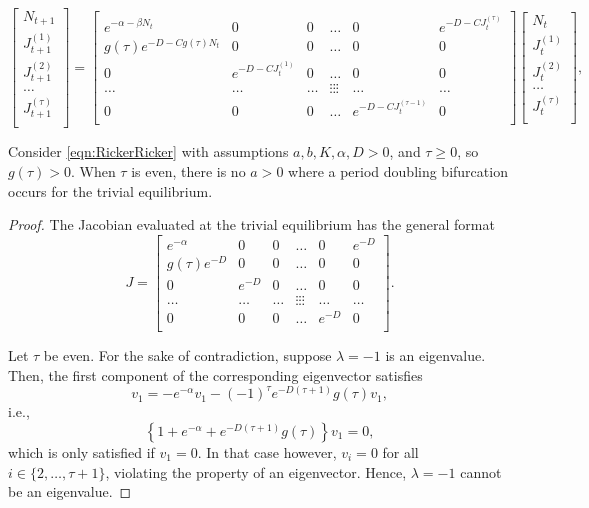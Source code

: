 \documentclass[10pt,a4paper]{amsart}
\begin{document}
\begin{equation} \label{eqn:RickerRicker}
   \begin{bmatrix}
    N_{t+1}\\
    J_{t+1}^{(1)}\\
    J_{t+1}^{(2)}\\
    \ldots\\
    J_{t+1}^{(\tau)}\\
    \end{bmatrix} = \begin{bmatrix}
e^{-\alpha-\beta N_t} & 0 & 0 & \ldots & 0 & e^{-D-CJ_{t}^{(\tau)}}\\
 g(\tau)e^{-D-C g(\tau)N_{t}} & 0 & 0 & \ldots & 0 & 0\\
0 & e^{-D-CJ_{t}^{(1)}} & 0 & \ldots & 0 & 0\\
\ldots & \ldots & \ldots & \vdots\vdots\vdots & \ldots & \ldots\\
0 & 0 & 0 & \ldots & e^{-D-CJ_{t}^{(\tau-1)}} & 0\\
\end{bmatrix}
\begin{bmatrix}
    N_t\\
    J_t^{(1)}\\
    J_t^{(2)}\\
    \ldots\\
    J_t^{(\tau)}\\
\end{bmatrix},
\end{equation}

\begin{theorem}\label{thm:RR_PD}
     Consider \eqref{eqn:RickerRicker} with assumptions $a,b,K,\alpha,D>0$, and $\tau\geq0$, so $g(\tau)>0$. When $\tau$ is even, there is no $a>0$ where a period doubling bifurcation occurs for the trivial equilibrium.
\end{theorem}

\begin{proof}
   The Jacobian evaluated at the trivial equilibrium has the general format
\begin{equation*} 
 J=\begin{bmatrix}
e^{-\alpha} & 0 & 0 & \ldots & 0 & e^{-D}\\
 g(\tau)e^{-D} & 0 & 0 & \ldots & 0 & 0\\
0 & e^{-D} & 0 & \ldots & 0 & 0\\
\ldots & \ldots & \ldots & \vdots\vdots\vdots & \ldots & \ldots\\
0 & 0 & 0 & \ldots & e^{-D} & 0\\
\end{bmatrix}.
\end{equation*}

Let $\tau$ be even. For the sake of contradiction, suppose $\lambda=-1$ is an eigenvalue. Then, the first component of the corresponding eigenvector satisfies
$$v_1=-e^{-\alpha}v_1-(-1)^{\tau}e^{-D(\tau+1)}g(\tau)v_1,$$
i.e., $$\left\{1+e^{-\alpha}+e^{-D(\tau+1)}g(\tau)\right\}v_1=0,$$
which is only satisfied if $v_1=0$. In that case however, $v_i=0$ for all $i\in \{2,\ldots, \tau+1\}$, violating the property of an eigenvector. Hence, $\lambda=-1$ cannot be an eigenvalue. 
\end{proof}
\end{document}
